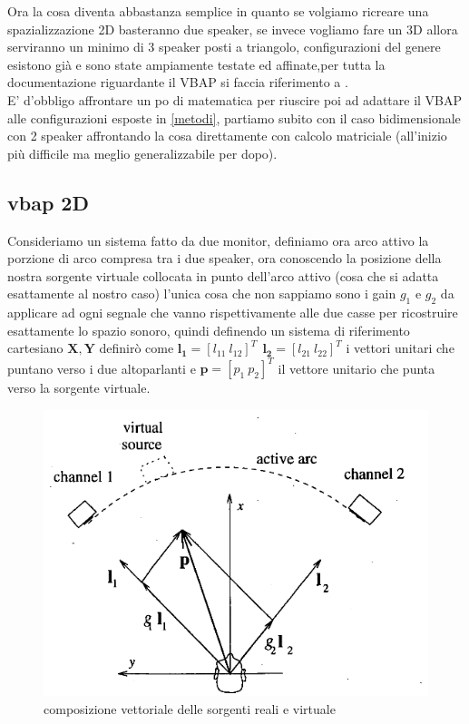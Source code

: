 \documentclass[12pt,a4paper]{report}
\begin{document}
Ora la cosa diventa abbastanza semplice in quanto se volgiamo ricreare una spazializzazione 2D basteranno due speaker, se invece vogliamo fare un 3D allora serviranno un minimo di 3 speaker posti a triangolo, configurazioni del genere esistono già e sono state ampiamente testate ed affinate,per tutta la documentazione riguardante il VBAP si faccia riferimento a \cite{vbap}.\\

E' d'obbligo affrontare un po di matematica per riuscire poi ad adattare il VBAP alle configurazioni esposte in \ref{metodi}, partiamo subito con il caso bidimensionale con 2 speaker affrontando la cosa direttamente con calcolo matriciale (all'inizio più difficile ma meglio generalizzabile per dopo).\\

\subsection{vbap 2D}\label{c}
Consideriamo un sistema fatto da due monitor, definiamo ora arco attivo la porzione di arco compresa tra i due speaker, ora conoscendo la posizione della nostra sorgente virtuale collocata in punto dell'arco attivo (cosa che si adatta esattamente al nostro caso) l'unica cosa che non sappiamo sono i gain $g_1$ e $g_2$ da applicare ad ogni segnale che vanno rispettivamente alle due casse per ricostruire esattamente lo spazio sonoro, quindi definendo un sistema di riferimento cartesiano $ \boldsymbol{X},\boldsymbol{Y}$ definirò come $ \boldsymbol{l_{1}}= {\left[ l_{11} \ l_{12} \right]}^T \ \  \boldsymbol{l_{2}}= {\left[ l_{21} \ l_{22} \right]}^T$ i vettori unitari che puntano verso i due altoparlanti e $\boldsymbol{p}= {\left[ p_1 \ p_2 \right]}^T$ il vettore unitario che punta verso la sorgente virtuale.\\ 

\begin{figure}[htbp]
	\centering
	\includegraphics[scale=0.40]{figures/matrix2d.png}
	\caption {composizione vettoriale delle sorgenti reali e virtuale} 
	\label{fig:vettori2d}
	\end{figure}
\end{document}
